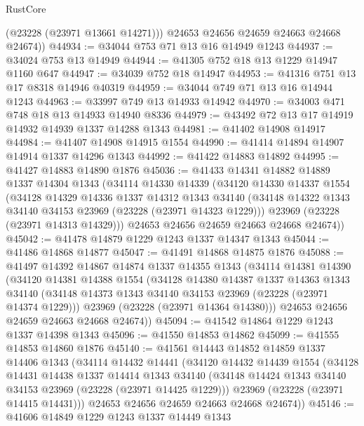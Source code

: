 \begin{lexlean}{RustCore}
\begin{coremodule}
          (@23228 (@23971 @13661 @14271)))
        @24653
        @24656
        @24659
        @24663
        @24668
        @24674))
@44934 := @34044 @753 @71 @13 @16 @14949 @1243
@44937 := @34024 @753 @13 @14949
@44944 := @41305 @752 @18 @13 @1229 @14947 @1160 @647
@44947 := @34039 @752 @18 @14947
@44953 := @41316 @751 @13 @17 @8318 @14946 @40319
@44959 := @34044 @749 @71 @13 @16 @14944 @1243
@44963 := @33997 @749 @13 @14933 @14942
@44970 := @34003 @471 @748 @18 @13 @14933 @14940 @8336
@44979 := @43492 @72 @13 @17 @14919 @14932 @14939 @1337 @14288 @1343
@44981 := @41402 @14908 @14917
@44984 := @41407 @14908 @14915 @1554
@44990 := @41414 @14894 @14907 @14914 @1337 @14296 @1343
@44992 := @41422 @14883 @14892
@44995 := @41427 @14883 @14890 @1876
@45036 := @41433
    @14341
    @14882
    @14889
    @1337
    @14304
    @1343
    (@34114
      @14330
      @14339
      (@34120
        @14330
        @14337
        @1554
        (@34128
          @14329
          @14336
          @1337
          @14312
          @1343
          @34140
          (@34148 @14322 @1343 @34140 @34153 @23969 (@23228 (@23971 @14323 @1229)))
          @23969
          (@23228 (@23971 @14313 @14329)))
        @24653
        @24656
        @24659
        @24663
        @24668
        @24674))
@45042 := @41478 @14879 @1229 @1243 @1337 @14347 @1343
@45044 := @41486 @14868 @14877
@45047 := @41491 @14868 @14875 @1876
@45088 := @41497
    @14392
    @14867
    @14874
    @1337
    @14355
    @1343
    (@34114
      @14381
      @14390
      (@34120
        @14381
        @14388
        @1554
        (@34128
          @14380
          @14387
          @1337
          @14363
          @1343
          @34140
          (@34148 @14373 @1343 @34140 @34153 @23969 (@23228 (@23971 @14374 @1229)))
          @23969
          (@23228 (@23971 @14364 @14380)))
        @24653
        @24656
        @24659
        @24663
        @24668
        @24674))
@45094 := @41542 @14864 @1229 @1243 @1337 @14398 @1343
@45096 := @41550 @14853 @14862
@45099 := @41555 @14853 @14860 @1876
@45140 := @41561
    @14443
    @14852
    @14859
    @1337
    @14406
    @1343
    (@34114
      @14432
      @14441
      (@34120
        @14432
        @14439
        @1554
        (@34128
          @14431
          @14438
          @1337
          @14414
          @1343
          @34140
          (@34148 @14424 @1343 @34140 @34153 @23969 (@23228 (@23971 @14425 @1229)))
          @23969
          (@23228 (@23971 @14415 @14431)))
        @24653
        @24656
        @24659
        @24663
        @24668
        @24674))
@45146 := @41606 @14849 @1229 @1243 @1337 @14449 @1343

\end{coremodule}
\end{lexlean}
